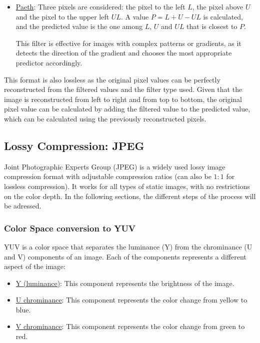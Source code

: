 \begin{itemize}
\begin{itemize}
        This filter is effective for images with diagonal patterns or gradients.
        \item \ul{Paeth}: Three pixels are considered: the pixel to the left $L$, the pixel above $U$ and the pixel to the upper left $UL$. A value $P=L+U-UL$ is calculated, and the predicted value is the one among $L$, $U$ and $UL$ that is closest to $P$.
        
        This filter is effective for images with complex patterns or gradients, as it detects the direction of the gradient and chooses the most appropriate predictor accordingly.
    \end{itemize}

    This format is also lossless as the original pixel values can be perfectly reconstructed from the filtered values and the filter type used. Given that the image is reconstructed from left to right and from top to bottom, the original pixel value can be calculated by adding the filtered value to the predicted value, which can be calculated using the previously reconstructed pixels.
\end{itemize}


\subsection{Lossy Compression: JPEG}

Joint Photographic Experts Group (JPEG) is a widely used lossy image compression format with adjustable compression ratios (can also be $1:1$ for lossless compression). It works for all types of static images, with no restrictions on the color depth. In the following sections, the different steps of the process will be adressed.

\subsubsection{Color Space conversion to YUV}

YUV is a color space that separates the luminance (Y) from the chrominance (U and V) components of an image. Each of the components represents a different aspect of the image:
\begin{itemize}
    \item \ul{Y (luminance)}: This component represents the brightness of the image.
    \item \ul{U chrominance}: This component represents the color change from yellow to blue.
    \item \ul{V chrominance}: This component represents the color change from green to red.
\end{itemize}

